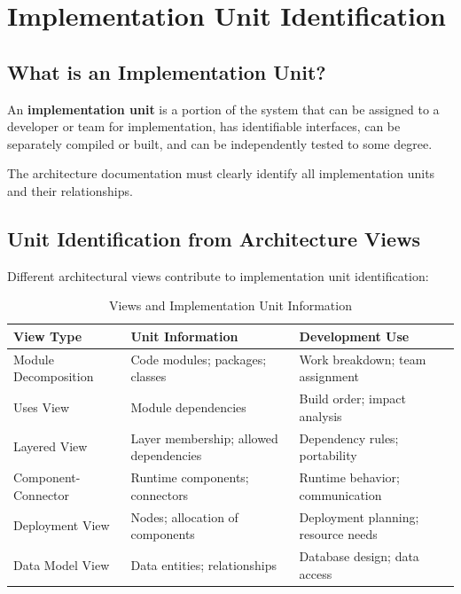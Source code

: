\documentclass[11pt]{article}
\begin{document}
\section{Implementation Unit Identification}

\subsection{What is an Implementation Unit?}

\begin{definition}
An \textbf{implementation unit} is a portion of the system that can be assigned to a developer or team for implementation, has identifiable interfaces, can be separately compiled or built, and can be independently tested to some degree.
\end{definition}

The architecture documentation must clearly identify all implementation units and their relationships.

\subsection{Unit Identification from Architecture Views}

Different architectural views contribute to implementation unit identification:

\begin{longtable}{@{}L{3cm} L{4.5cm} L{5cm}@{}}
\caption{Views and Implementation Unit Information} \\
\toprule
\textbf{View Type} & \textbf{Unit Information} & \textbf{Development Use} \\
\midrule
\endfirsthead
\bottomrule
\endlastfoot
Module Decomposition & Code modules; packages; classes & Work breakdown; team assignment \\
Uses View & Module dependencies & Build order; impact analysis \\
Layered View & Layer membership; allowed dependencies & Dependency rules; portability \\
Component-Connector & Runtime components; connectors & Runtime behavior; communication \\
Deployment View & Nodes; allocation of components & Deployment planning; resource needs \\
Data Model View & Data entities; relationships & Database design; data access \\
\end{longtable}
\end{document}
